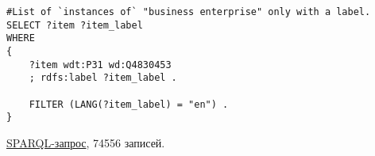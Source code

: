 \begin{lstlisting}[language=SPARQL,label=nameless,caption=Список организаций с указанным названием]
#List of `instances of` "business enterprise" only with a label.
SELECT ?item ?item_label
WHERE
{
    ?item wdt:P31 wd:Q4830453
    ; rdfs:label ?item_label . 

    FILTER (LANG(?item_label) = "en") . 
}
\end{lstlisting}

\href{https://query.wikidata.org/#SELECT%20%3Fitem%20%3Fitem_label%0AWHERE%0A%7B%0A%20%20%20%20%3Fitem%20wdt%3AP31%20wd%3AQ4830453%0A%20%20%20%20%3B%20rdfs%3Alabel%20%3Fitem_label%20.%20%0A%0A%20%20%20%20FILTER%20%28LANG%28%3Fitem_label%29%20%3D%20%22en%22%29%20.%20%0A%7D}{SPARQL-запрос}, 74556 записей.